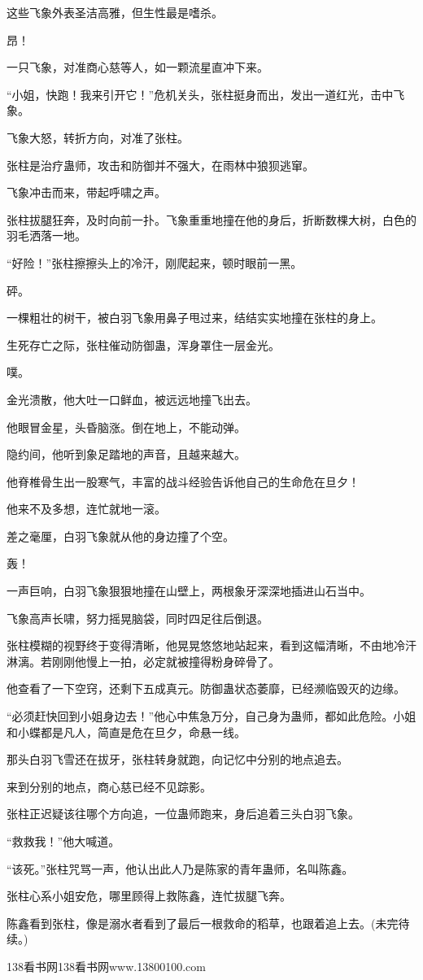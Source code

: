 \begin{this_body}
这些飞象外表圣洁高雅，但生性最是嗜杀。

昂！

一只飞象，对准商心慈等人，如一颗流星直冲下来。

“小姐，快跑！我来引开它！”危机关头，张柱挺身而出，发出一道红光，击中飞象。

飞象大怒，转折方向，对准了张柱。

张柱是治疗蛊师，攻击和防御并不强大，在雨林中狼狈逃窜。

飞象冲击而来，带起呼啸之声。

张柱拔腿狂奔，及时向前一扑。飞象重重地撞在他的身后，折断数棵大树，白色的羽毛洒落一地。

“好险！”张柱擦擦头上的冷汗，刚爬起来，顿时眼前一黑。

砰。

一棵粗壮的树干，被白羽飞象用鼻子甩过来，结结实实地撞在张柱的身上。

生死存亡之际，张柱催动防御蛊，浑身罩住一层金光。

噗。

金光溃散，他大吐一口鲜血，被远远地撞飞出去。

他眼冒金星，头昏脑涨。倒在地上，不能动弹。

隐约间，他听到象足踏地的声音，且越来越大。

他脊椎骨生出一股寒气，丰富的战斗经验告诉他自己的生命危在旦夕！

他来不及多想，连忙就地一滚。

差之毫厘，白羽飞象就从他的身边撞了个空。

轰！

一声巨响，白羽飞象狠狠地撞在山壁上，两根象牙深深地插进山石当中。

飞象高声长啸，努力摇晃脑袋，同时四足往后倒退。

张柱模糊的视野终于变得清晰，他晃晃悠悠地站起来，看到这幅清晰，不由地冷汗淋漓。若刚刚他慢上一拍，必定就被撞得粉身碎骨了。

他查看了一下空窍，还剩下五成真元。防御蛊状态萎靡，已经濒临毁灭的边缘。

“必须赶快回到小姐身边去！”他心中焦急万分，自己身为蛊师，都如此危险。小姐和小蝶都是凡人，简直是危在旦夕，命悬一线。

那头白羽飞雪还在拔牙，张柱转身就跑，向记忆中分别的地点追去。

来到分别的地点，商心慈已经不见踪影。

张柱正迟疑该往哪个方向追，一位蛊师跑来，身后追着三头白羽飞象。

“救救我！”他大喊道。

“该死。”张柱咒骂一声，他认出此人乃是陈家的青年蛊师，名叫陈鑫。

张柱心系小姐安危，哪里顾得上救陈鑫，连忙拔腿飞奔。

陈鑫看到张柱，像是溺水者看到了最后一根救命的稻草，也跟着追上去。(未完待续。)

138看书网138看书网www.13800100.com

\end{this_body}

